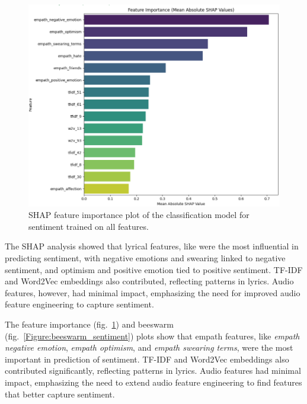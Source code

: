 \begin{center}
\begin{figure}[H]
  \centering
  \includegraphics[width=6in]{img/feature_importance_sentiment.png}
  \caption{SHAP feature importance plot of the classification model for
  sentiment trained on all features.}
  \label{Figure:feature_importance_sentiment}
\end{figure}
\end{center}

The SHAP analysis showed that lyrical features,
like were the most influential in predicting sentiment, with negative emotions
and swearing linked to negative sentiment, and optimism and positive emotion
tied to positive sentiment. TF-IDF and Word2Vec embeddings also contributed,
reflecting patterns in lyrics. Audio features, however, had minimal impact,
emphasizing the need for improved audio feature engineering to capture
sentiment.

The feature importance (fig.~\ref{Figure:feature_importance_sentiment}) and
beeswarm (fig.~\ref{Figure:beeswarm_sentiment}) plots show that empath
features, like \textit{empath negative emotion}, \textit{empath optimism}, and
\textit{empath swearing terms}, were the most important in prediction of
sentiment. TF-IDF and Word2Vec embeddings also contributed significantly,
reflecting patterns in lyrics. Audio features had minimal impact, emphasizing
the need to extend audio feature engineering to find features that better
capture sentiment.

